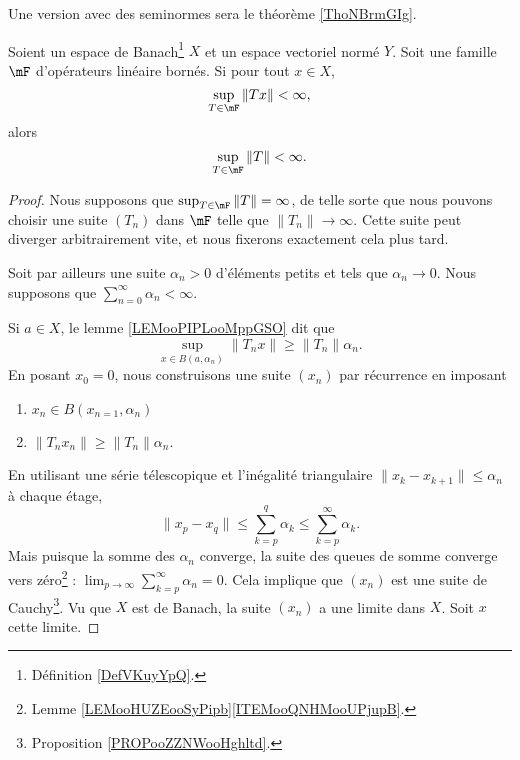 Une version avec des seminormes sera le théorème \ref{ThoNBrmGIg}.
\begin{theorem}       \label{THOooJHVNooIDDxyT}
	Soient un espace de Banach\footnote{Définition \ref{DefVKuyYpQ}.} \( X\) et un espace vectoriel normé \( Y\). Soit une famille \( \mF\) d'opérateurs linéaire bornés. Si pour tout \( x\in  X\),
	\begin{equation}
		\sup_{T\in\mF}\| Tx \|<\infty,
	\end{equation}
	alors
	\begin{equation}
		\sup_{T\in \mF}\| T \|<\infty.
	\end{equation}
\end{theorem}

\begin{proof}
	Nous supposons que \( \sup_{T\in\mF}\| T \|=\infty\), de telle sorte que nous pouvons choisir une suite \( (T_n)\) dans \( \mF\) telle que \( \| T_n \|\to \infty\). Cette suite peut diverger arbitrairement vite, et nous fixerons exactement cela plus tard.

	Soit par ailleurs une suite \( \alpha_n>0\) d'éléments petits et tels que \( \alpha_n\to 0\). Nous supposons que \( \sum_{n=0}^{\infty}\alpha_n<\infty\).

	Si \( a\in X\), le lemme \ref{LEMooPIPLooMppGSO} dit que
	\begin{equation}
		\sup_{x\in B(a,\alpha_n)}\| T_nx \|\geq \| T_n \|\alpha_n.
	\end{equation}
	En posant \( x_0=0\), nous construisons une suite \( (x_n)\) par récurrence en imposant
	\begin{enumerate}
		\item
		      \( x_n\in B(x_{n=1}, \alpha_n)\)
		\item
		      \( \| T_nx_n \|\geq \| T_n \|\alpha_n\).
	\end{enumerate}
	En utilisant une série télescopique et l'inégalité triangulaire \( \| x_k-x_{k+1} \|\leq \alpha_n\) à chaque étage,
	\begin{equation}
		\| x_p-x_q \|\leq \sum_{k=p}^q\alpha_k\leq \sum_{k=p}^{\infty}\alpha_k.
	\end{equation}
	Mais puisque la somme des \( \alpha_n\) converge, la suite des queues de somme converge vers zéro\footnote{Lemme \ref{LEMooHUZEooSyPipb}\ref{ITEMooQNHMooUPjupB}.} : \( \lim_{p\to \infty}\sum_{k=p}^{\infty}\alpha_n=0\). Cela implique que \( (x_n)\) est une suite de Cauchy\footnote{Proposition \ref{PROPooZZNWooHghltd}.}. Vu que \( X\) est de Banach, la suite \( (x_n)\) a une limite dans \( X\). Soit \( x\) cette limite.


\end{proof}
